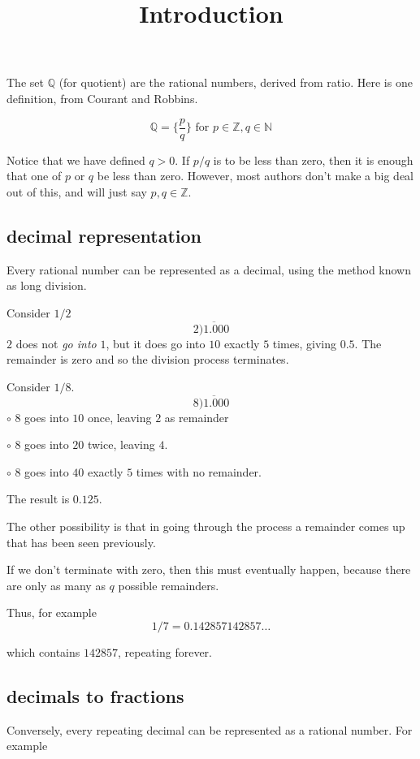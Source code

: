 \documentclass[11pt, oneside]{article}
\title{Introduction}
\date{}
\begin{document}
\maketitle
\Large

The set $\mathbb{Q}$ (for quotient) are the rational numbers, derived from ratio.  Here is one definition, from Courant and Robbins.

\[ \mathbb{Q} = \{ \frac{p}{q} \} \text{ for } p \in \mathbb{Z}, q \in \mathbb{N} \]

Notice that we have defined $q > 0$.  If $p/q$ is to be less than zero, then it is enough that one of $p$ or $q$ be less than zero.  However, most authors don't make a big deal out of this, and will just say $p,q \in \mathbb{Z}$.

\subsection*{decimal representation}

Every rational number can be represented as a decimal, using the method known as long division.

Consider $1/2$
\[ 2 \overline{)1.000} \]
$2$ does not \emph{go into} $1$, but it does go into $10$ exactly $5$ times, giving $0.5$.  The remainder is zero and so the division process terminates.

Consider $1/8$.
\[ 8 \overline{)1.000} \]
$\circ$  $8$ goes into $10$ once, leaving $2$ as remainder

$\circ$  $8$ goes into $20$ twice, leaving $4$.  

$\circ$  $8$ goes into $40$ exactly $5$ times with no remainder.

The result is $0.125$.

The other possibility is that in going through the process a remainder comes up that has been seen previously.  

If we don't terminate with zero, then this must eventually happen, because there are only as many as $q$ possible remainders.

Thus, for example
\[ 1/7 = 0.142857142857 \dots \]

which contains $142857$, repeating forever.

\subsection*{decimals to fractions}

Conversely, every repeating decimal can be represented as a rational number.  For example
\end{document}
